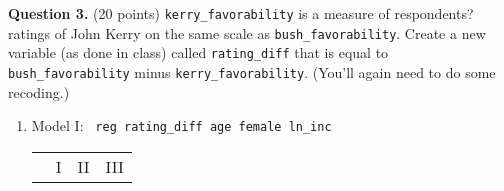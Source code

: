 \documentclass[12pt]{article}
\begin{document}
\begin{enumerate}
\end{enumerate}


\vspace{4mm}

\textbf{Question 3.} \hspace{3mm} (20 points) \verb|kerry_favorability| is a measure of respondents? ratings of John Kerry on the same scale as \verb|bush_favorability|. Create a new variable (as done in class) called \verb|rating_diff| that is equal to \verb|bush_favorability| minus \verb|kerry_favorability|. (You'll again need to do some recoding.)

\vspace{4mm} 
\renewcommand{\theenumi}{\alph{enumi}}
\begin{enumerate}
\item Model I: \verb| reg rating_diff age female ln_inc|

	
\begin{table}[H] \centering 
\def\sym#1{\ifmmode^{#1}\else\(^{#1}\)\fi}
\begin{tabular}{l*{3}{c}}
\hline\hline
                                                  &\multicolumn{1}{c}{I}&\multicolumn{1}{c}{II}&\multicolumn{1}{c}{III}\\


\end{tabular}
\end{table}
\end{enumerate}
\end{document}
